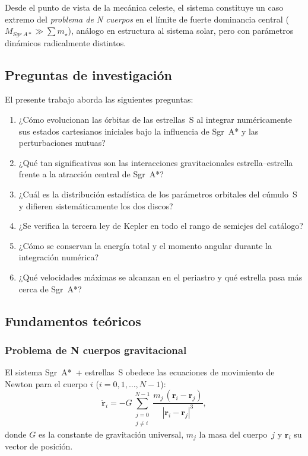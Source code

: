 \documentclass[12pt,a4paper]{article}
\newcommand{\SgrA}{Sgr~A*}
\begin{document}
Desde el punto de vista de la mecánica celeste, el sistema constituye un caso extremo
del \emph{problema de N cuerpos} en el límite de fuerte dominancia central
($M_{\SgrA} \gg \sum m_\star$), análogo en estructura al sistema solar, pero con
parámetros dinámicos radicalmente distintos.

\subsection{Preguntas de investigación}
\label{subsec:preguntas}

El presente trabajo aborda las siguientes preguntas:
\begin{enumerate}[label=\textbf{P\arabic*.}, itemsep=3pt]
  \item ¿Cómo evolucionan las órbitas de las estrellas~S al integrar numéricamente
    sus estados cartesianos iniciales bajo la influencia de \SgrA{} y las
    perturbaciones mutuas?
  \item ¿Qué tan significativas son las interacciones gravitacionales
    estrella--estrella frente a la atracción central de \SgrA{}?
  \item ¿Cuál es la distribución estadística de los parámetros orbitales del cúmulo~S
    y difieren sistemáticamente los dos discos?
  \item ¿Se verifica la tercera ley de Kepler en todo el rango de semiejes del
    catálogo?
  \item ¿Cómo se conservan la energía total y el momento angular durante la
    integración numérica?
  \item ¿Qué velocidades máximas se alcanzan en el periastro y qué estrella pasa más
    cerca de \SgrA{}?
\end{enumerate}

\subsection{Fundamentos teóricos}
\label{subsec:teoria}

\subsubsection{Problema de N cuerpos gravitacional}
\label{subsubsec:ncuerpos}

El sistema \SgrA{}~+ estrellas~S obedece las ecuaciones de movimiento de Newton para
el cuerpo $i$ ($i = 0, 1, \ldots, N-1$):
\begin{equation}
  \ddot{\bm{r}}_i = -G \sum_{\substack{j=0 \\ j \neq i}}^{N-1}
    \frac{m_j\,(\bm{r}_i - \bm{r}_j)}{|\bm{r}_i - \bm{r}_j|^3},
  \label{eq:ncuerpos}
\end{equation}
donde $G$ es la constante de gravitación universal, $m_j$ la masa del cuerpo~$j$ y
$\bm{r}_i$ su vector de posición.
\end{document}
